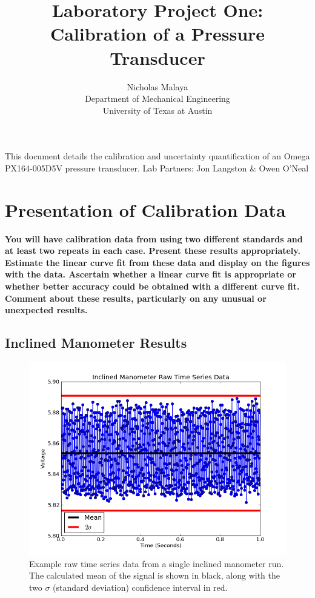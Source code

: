 \documentclass{article}
\title{\bf{Laboratory Project One: Calibration of a Pressure Transducer}}
\author{Nicholas Malaya \\ Department of Mechanical Engineering \\ University of Texas at Austin} \date{}
\begin{document}
\maketitle
\date{}

This document details the calibration and uncertainty quantification of
an Omega PX164-005D5V pressure transducer. 
\newline
\newline
Lab Partners: Jon Langston \& Owen O'Neal

\newpage
\section{Presentation of Calibration Data}

\textbf{You will have calibration data from using two different
standards and at least two repeats in each case.  
Present these results appropriately. Estimate the linear curve fit from
these data and display on the figures with the data.  
Ascertain whether a linear curve fit is appropriate or whether better
accuracy could be obtained with a different curve fit. Comment about
these results, particularly on any unusual or unexpected results.}  

\subsection*{Inclined Manometer Results}

  \begin{figure}[!htb]
   \begin{center}
    \includegraphics[width = 12 cm]{figs/incl_time.png}
    \caption{Example raw time series data from a single inclined manometer
    run. The calculated mean of the signal is shown in black, along with
    the two $\sigma$ (standard deviation) confidence interval in
    red.}
    \label{incl-time}
   \end{center}
  \end{figure}
\end{document}
